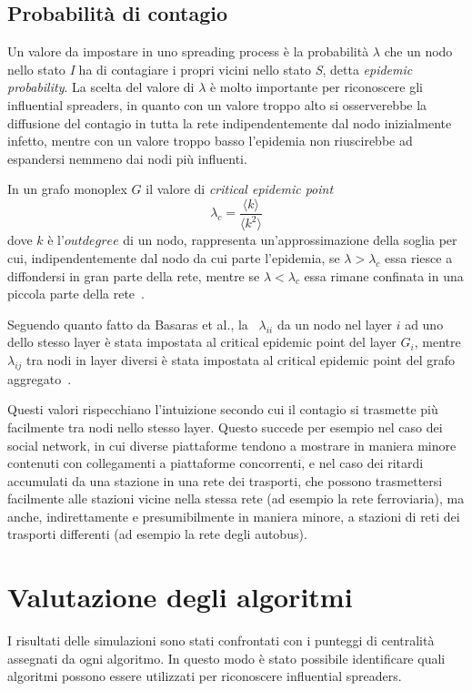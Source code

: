 \subsection{Probabilità di contagio}
\label{sec:epprob}
Un valore da impostare in uno spreading process è la probabilità $\lambda$ che un nodo nello stato \emph{I}
ha di contagiare i propri vicini nello stato \emph{S}, detta \emph{epidemic probability}.
La scelta del valore di $\lambda$ è molto importante per riconoscere gli influential spreaders, 
in quanto con un valore troppo alto si osserverebbe la diffusione del contagio in tutta la 
rete indipendentemente dal nodo inizialmente infetto, mentre con un valore troppo basso l'epidemia 
non riuscirebbe ad espandersi nemmeno dai nodi più influenti. 

In un grafo monoplex $G$ il valore di \emph{critical epidemic point}
\begin{equation*}
    \lambda_c = \frac{\langle k  \rangle}{\langle k^2 \rangle}
\end{equation*}
dove $k$ è l'$\mathit{outdegree}$ di un nodo, rappresenta un'approssimazione della soglia per 
cui, indipendentemente dal nodo da cui parte l'epidemia, se $\lambda > \lambda_c$ essa riesce 
a diffondersi in gran parte della rete, mentre se $\lambda < \lambda_c$ essa rimane confinata 
in una piccola parte della rete~\cite{saumell:epidemicsp}.

Seguendo quanto fatto da Basaras et al., la \epprob\ $\lambda_{ii}$ da un nodo nel 
layer $i$ ad uno dello stesso layer è stata impostata al critical epidemic point del layer $G_i$, 
mentre $\lambda_{ij}$ tra nodi in layer diversi è stata impostata al critical epidemic point del grafo 
aggregato~\cite{basaras:infspmul}. 

Questi valori rispecchiano l'intuizione secondo cui il contagio si trasmette 
più facilmente tra nodi nello stesso layer. Questo succede per esempio nel caso dei social 
network, in cui diverse piattaforme tendono a mostrare in maniera minore contenuti con
collegamenti a piattaforme concorrenti, e nel caso dei ritardi accumulati da 
una stazione in una rete dei trasporti, che possono trasmettersi facilmente alle stazioni vicine 
nella stessa rete (ad esempio la rete ferroviaria), ma anche, indirettamente e presumibilmente in maniera
minore, a stazioni di reti dei trasporti differenti (ad esempio la rete degli autobus).

\section{Valutazione degli algoritmi}
I risultati delle simulazioni sono stati confrontati con i punteggi di centralità
assegnati da ogni algoritmo. In questo modo è stato possibile identificare quali algoritmi 
possono essere utilizzati per riconoscere influential spreaders.

